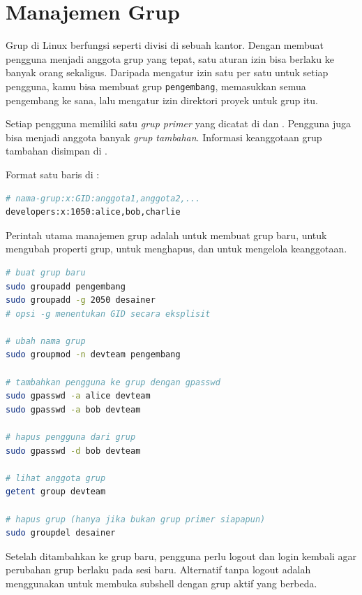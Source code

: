 \section{Manajemen Grup}
\label{sec:group-management}

Grup di Linux berfungsi seperti divisi di sebuah kantor. Dengan membuat pengguna menjadi anggota grup yang tepat, satu aturan izin bisa berlaku ke banyak orang sekaligus. Daripada mengatur izin satu per satu untuk setiap pengguna, kamu bisa membuat grup \texttt{pengembang}, memasukkan semua pengembang ke sana, lalu mengatur izin direktori proyek untuk grup itu.

Setiap pengguna memiliki satu \textit{grup primer} yang dicatat di  dan . Pengguna juga bisa menjadi anggota banyak \textit{grup tambahan}. Informasi keanggotaan grup tambahan disimpan di .

Format satu baris di :

\begin{lstlisting}[language=bash, caption={Format berkas /etc/group}]
# nama-grup:x:GID:anggota1,anggota2,...
developers:x:1050:alice,bob,charlie
\end{lstlisting}

Perintah utama manajemen grup adalah  untuk membuat grup baru,  untuk mengubah properti grup,  untuk menghapus, dan  untuk mengelola keanggotaan.

\begin{lstlisting}[language=bash, caption={Operasi dasar manajemen grup}]
# buat grup baru
sudo groupadd pengembang
sudo groupadd -g 2050 desainer
# opsi -g menentukan GID secara eksplisit

# ubah nama grup
sudo groupmod -n devteam pengembang

# tambahkan pengguna ke grup dengan gpasswd
sudo gpasswd -a alice devteam
sudo gpasswd -a bob devteam

# hapus pengguna dari grup
sudo gpasswd -d bob devteam

# lihat anggota grup
getent group devteam

# hapus grup (hanya jika bukan grup primer siapapun)
sudo groupdel desainer
\end{lstlisting}

Setelah ditambahkan ke grup baru, pengguna perlu logout dan login kembali agar perubahan grup berlaku pada sesi baru. Alternatif tanpa logout adalah menggunakan  untuk membuka subshell dengan grup aktif yang berbeda.

